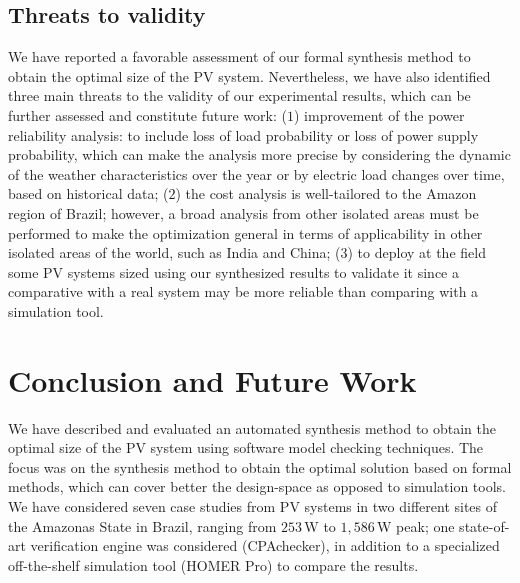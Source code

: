 \documentclass[journal]{IEEEtran}
\begin{document}
\subsection{Threats to validity}

We have reported a favorable assessment of our formal synthesis method to obtain the optimal size of the PV system. 
Nevertheless, we have also identified three main threats to the validity of our experimental results, which can be further assessed and 
constitute future work: ($1$) improvement of the power reliability 
analysis: to include loss of load probability or loss of power 
supply probability, which can make the analysis more precise by considering the dynamic of the weather characteristics over the year or by electric load changes over time, 
based on historical data; 
($2$) the cost analysis is well-tailored to the Amazon region of Brazil; 
however, a broad analysis from other isolated areas must be 
performed to make the optimization general in terms 
of applicability in other isolated areas of the world, such as India and China; ($3$) to deploy at the field some PV systems 
sized using our synthesized results to validate it since a comparative with a real system may be more reliable than comparing with a simulation tool.


\section{Conclusion and Future Work}
\label{sec:Conclusion}

We have described and evaluated an automated synthesis method to obtain the optimal size of the PV system using software model checking techniques. The focus was on the synthesis method to obtain the optimal solution based on formal methods, which can cover better the design-space as opposed to simulation tools. We have considered seven case studies from PV systems in two different sites of the Amazonas State in Brazil, ranging from $253$\,W to $1,586$\,W peak; one state-of-art verification engine was considered (CPAchecker), in addition to a specialized off-the-shelf simulation tool (HOMER Pro) to compare the results.
\end{document}
